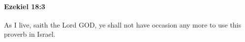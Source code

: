 
		\paragraph{Ezekiel 18:3} %
			\label{EZEKIEL-18-3}

			As I live, saith the Lord GOD, ye shall not have occasion any more to use this proverb in Israel.


